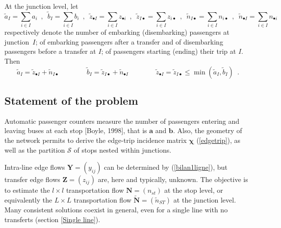 \documentclass{bmcart}
\begin{document}
At the junction level, let 
\begin{displaymath}
\tilde{a}_I=\sum_{i\in I} a_i\enspace,\enspace\tilde{b}_I=\sum_{i\in I} b_i\enspace,\enspace\tilde{z}_{\bullet I}=\sum_{i\in I} z_{\bullet i}\enspace,\enspace\tilde{z}_{I\bullet}=\sum_{i\in I} z_{i\bullet}\enspace,\enspace\tilde{n}_{I\bullet}=\sum_{i\in I} n_{i\bullet}\enspace,\enspace\tilde{n}_{\bullet I}=\sum_{i\in I} n_{\bullet i}
\end{displaymath}
 respectively denote the number of embarking (disembarking)  passengers at junction~$I$; of embarking passengers after a transfer and of disembarking passengers before a transfer at  $I$; of passengers starting (ending) their trip at $I$. Then 
\begin{equation}
\label{junctionLevel}
\tilde{a}_I=\tilde{z}_{\bullet I}+\tilde{n}_{I\bullet}\qquad\qquad \tilde{b}_I=\tilde{z}_{I\bullet}+\tilde{n}_{\bullet I}\qquad\qquad \tilde{z}_{\bullet I}=\tilde{z}_{I\bullet}\le \min(\tilde{a}_I,\tilde{b}_I)\enspace. 
\end{equation}

 
\subsection{Statement of the problem}
Automatic passenger counters measure the number of passengers entering and leaving buses at each stop [Boyle, 1998], that is $\mathbf{a}$ and $\mathbf{b}$. Also, the geometry of the network permits to derive the edge-trip incidence matrix $\bm{\chi}$ (\ref{edgetrip}), as well as the partition $\mathcal{S}$  of stops nested within junctions. 

Intra-line edge flows $\mathbf{Y}=(y_{ij})$ can be determined by (\ref{bilan1ligne}), but transfer edge flows $\mathbf{Z}=(z_{ij})$ are, here and typically, unknown. The objective is to estimate the $l\times l$ transportation flow $\mathbf{N}=(n_{st})$ at the stop level, or equivalently  the $L\times L$  transportation flow  $\tilde{\mathbf{N}}=(\tilde{n}_{ST})$ at the junction level. Many consistent solutions coexist in general, even for a single line with no transferts (section \ref{Single line}).
\end{document}
